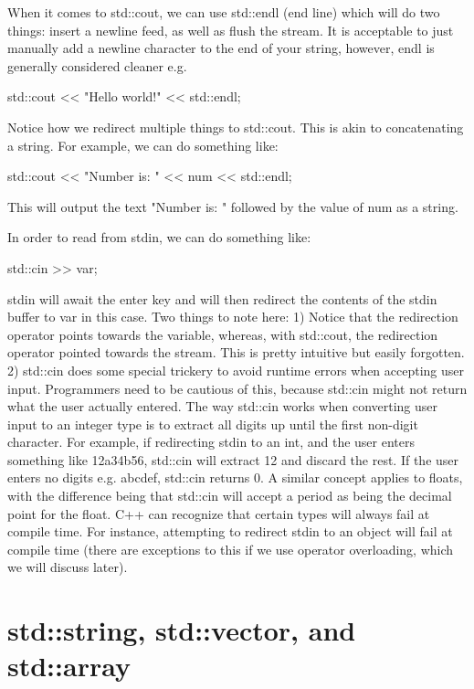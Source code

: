 \documentclass{article}
\begin{document}
When it comes to std::cout, we can use std::endl (end line) which will do two things: insert a newline feed,
as well as flush the stream. It is acceptable to just manually add a newline character to the end of your
string, however, endl is generally considered cleaner e.g.

\begin{cpplst}
std::cout << "Hello world!" << std::endl;
\end{cpplst}

Notice how we redirect multiple things to std::cout. This is akin to concatenating a string. For example, we
can do something like:

\begin{cpplst}
std::cout << "Number is: " << num << std::endl;
\end{cpplst}

This will output the text "Number is: " followed by the value of num as a string.

In order to read from stdin, we can do something like:

\begin{cpplst}
std::cin >> var;
\end{cpplst}

stdin will await the enter key and will then redirect the contents of the stdin buffer to var in this case.
Two things to note here: 1) Notice that the redirection operator points towards the variable, whereas, with
std::cout, the redirection operator pointed towards the stream. This is pretty intuitive but easily forgotten.
2) std::cin does some special trickery to avoid runtime errors when accepting user input. Programmers need to
be cautious of this, because std::cin might not return what the user actually entered. The way std::cin works
when converting user input to an integer type is to extract all digits up until the first non-digit character.
For example, if redirecting stdin to an int, and the user enters something like 12a34b56, std::cin will
extract 12 and discard the rest. If the user enters no digits e.g. abcdef, std::cin returns 0. A similar
concept applies to floats, with the difference being that std::cin will accept a period as being the decimal
point for the float. C++ can recognize that certain types will always fail at compile time. For instance,
attempting to redirect stdin to an object will fail at compile time (there are exceptions to this if we use
operator overloading, which we will discuss later).

\section{std::string, std::vector, and std::array}
\end{document}
